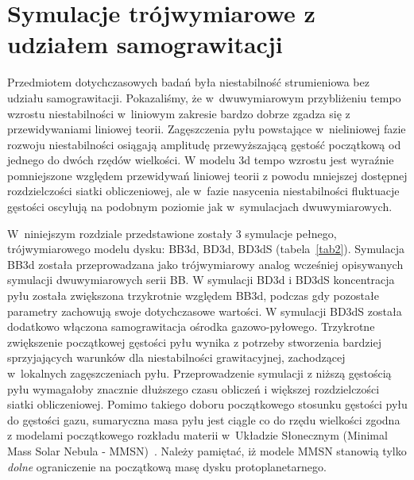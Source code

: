 \section{Symulacje trójwymiarowe z udziałem samograwitacji}
\label{sec:sim_3d}
Przedmiotem dotychczasowych badań była niestabilność strumieniowa bez udziału
samograwitacji. Pokazaliśmy, że w~dwuwymiarowym przybliżeniu tempo wzrostu
niestabilności w~liniowym zakresie bardzo dobrze zgadza się z przewidywaniami
liniowej teorii. Zagęszczenia pyłu powstające w~nieliniowej fazie rozwoju
niestabilności osiągają amplitudę przewyższającą gęstość początkową od jednego
do dwóch rzędów wielkości. W modelu 3d tempo wzrostu jest wyraźnie pomniejszone
względem przewidywań liniowej teorii z powodu mniejszej dostępnej rozdzielczości
siatki obliczeniowej, ale w~fazie nasycenia niestabilności fluktuacje
gęstości oscylują na podobnym poziomie jak w~symulacjach dwuwymiarowych. 
%
\par W~niniejszym rozdziale przedstawione zostały 3 symulacje pełnego,
trójwymiarowego modelu dysku: BB3d, BD3d, BD3dS (tabela~\ref{tab2}).  Symulacja
BB3d została przeprowadzana jako trójwymiarowy analog wcześniej opisywanych
symulacji dwuwymiarowych serii BB. W symulacji BD3d i BD3dS koncentracja pyłu
została zwiększona trzykrotnie względem BB3d, podczas gdy pozostałe parametry
zachowują swoje dotychczasowe wartości. W symulacji BD3dS została dodatkowo
włączona samograwitacja ośrodka gazowo-pyłowego. Trzykrotne zwiększenie
początkowej gęstości pyłu wynika z potrzeby stworzenia bardziej
sprzyjających warunków dla niestabilności grawitacyjnej, zachodzącej w~lokalnych
zagęszczeniach pyłu. Przeprowadzenie symulacji z niższą gęstością pyłu
wymagałoby znacznie dłuższego czasu obliczeń i większej rozdzielczości siatki
obliczeniowej. Pomimo takiego doboru początkowego stosunku gęstości pyłu do
gęstości gazu, sumaryczna masa pyłu jest ciągle co do rzędu wielkości zgodna z
modelami początkowego rozkładu materii w~Układzie Słonecznym (Minimal Mass Solar
Nebula - MMSN)~\cite{D07}. Należy
pamiętać, iż modele MMSN stanowią tylko \emph{dolne} ograniczenie na początkową
masę dysku protoplanetarnego.

